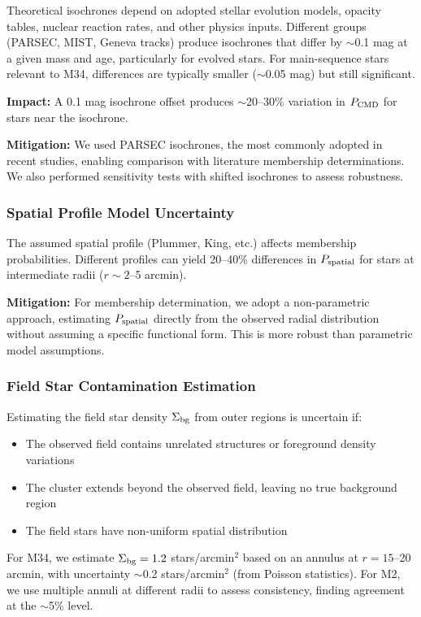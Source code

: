\documentclass[linenumbers,trackchanges,twocolumn]{aastex701}
\begin{document}
Theoretical isochrones depend on adopted stellar evolution models, opacity tables, nuclear reaction rates, and other physics inputs. Different groups (PARSEC, MIST, Geneva tracks) produce isochrones that differ by $\sim$0.1 mag at a given mass and age, particularly for evolved stars. For main-sequence stars relevant to M34, differences are typically smaller ($\sim$0.05 mag) but still significant.

\textbf{Impact:} A 0.1 mag isochrone offset produces $\sim$20--30\% variation in $P_{\rm CMD}$ for stars near the isochrone.

\textbf{Mitigation:} We used PARSEC isochrones, the most commonly adopted in recent studies, enabling comparison with literature membership determinations. We also performed sensitivity tests with shifted isochrones to assess robustness.

\subsubsection{Spatial Profile Model Uncertainty}

The assumed spatial profile (Plummer, King, etc.) affects membership probabilities. Different profiles can yield 20--40\% differences in $P_{\rm spatial}$ for stars at intermediate radii ($r \sim 2$--5 arcmin).

\textbf{Mitigation:} For membership determination, we adopt a non-parametric approach, estimating $P_{\rm spatial}$ directly from the observed radial distribution without assuming a specific functional form. This is more robust than parametric model assumptions.

\subsubsection{Field Star Contamination Estimation}

Estimating the field star density $\Sigma_{\rm bg}$ from outer regions is uncertain if:
\begin{itemize}
\item The observed field contains unrelated structures or foreground density variations
\item The cluster extends beyond the observed field, leaving no true background region
\item The field stars have non-uniform spatial distribution
\end{itemize}

For M34, we estimate $\Sigma_{\rm bg} = 1.2$ stars/arcmin$^2$ based on an annulus at $r = 15$--20 arcmin, with uncertainty $\sim$0.2 stars/arcmin$^2$ (from Poisson statistics). For M2, we use multiple annuli at different radii to assess consistency, finding agreement at the $\sim$5\% level.
\end{document}
